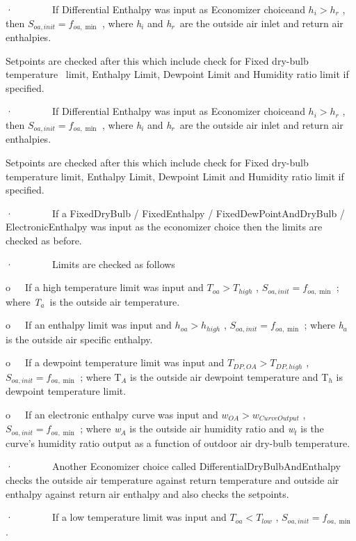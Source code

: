 ·~~~~~~~~If Differential Enthalpy was input as Economizer choiceand \({h_i} > {h_r}\) , then \({S_{oa,init}} = {f_{oa,\min }}\) , where \emph{h\(_{i}\)} and \emph{h\(_{r}\)}~are the outside air inlet and return air enthalpies.

Setpoints are checked after this which include check for Fixed dry-bulb temperature~ limit, Enthalpy Limit, Dewpoint Limit and Humidity ratio limit if specified.

·~~~~~~~~If Differential Enthalpy was input as Economizer choiceand \({h_i} > {h_r}\) , then \({S_{oa,init}} = {f_{oa,\min }}\) , where \emph{h\(_{i}\)} and \emph{h\(_{r}\)}~are the outside air inlet and return air enthalpies.

Setpoints are checked after this which include check for Fixed dry-bulb temperature limit, Enthalpy Limit, Dewpoint Limit and Humidity ratio limit if specified.

·~~~~~~~~If a FixedDryBulb / FixedEnthalpy / FixedDewPointAndDryBulb / ElectronicEnthalpy was input as the economizer choice then the limits are checked as before.

·~~~~~~~~Limits are checked as follows

o~~~If a high temperature limit was input and \({T_{oa}} > {T_{high}}\) , \({S_{oa,init}} = {f_{oa,\min }}\) ; where \emph{T\(_{a}\)}~is the outside air temperature.

o~~~If an enthalpy limit was input and \({h_{oa}} > {h_{high}}\) , \({S_{oa,init}} = {f_{oa,\min }}\) ; where \emph{h\(_{a}\)} is the outside air specific enthalpy.

o~~~If a dewpoint temperature limit was input and \({T_{DP,OA}} > {T_{DP,high}}\) , \({S_{oa,init}} = {f_{oa,\min }}\) ; where T\(_{A}\) is the outside air dewpoint temperature and T\(_{h}\) is dewpoint temperature limit.

o~~~If an electronic enthalpy curve was input and \({w_{OA}} > {w_{CurveOutput}}\) , \({S_{oa,init}} = {f_{oa,\min }}\) ; where \emph{w}\(_{A}\) is the outside air humidity ratio and \emph{w}\(_{t}\) is the curve's humidity ratio output as a function of outdoor air dry-bulb temperature.

·~~~~~~~~Another Economizer choice called DifferentialDryBulbAndEnthalpy checks the outside air temperature against return temperature and outside air enthalpy against return air enthalpy and also checks the setpoints.

·~~~~~~~~If a low temperature limit was input and \({T_{oa}} < {T_{low}}\) , \({S_{oa,init}} = {f_{oa,\min }}\) .

